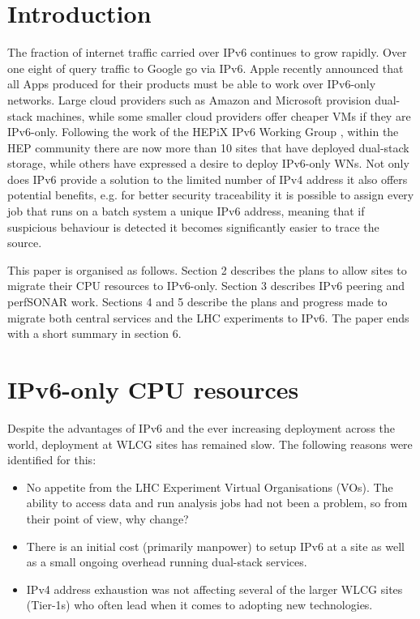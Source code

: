 \documentclass[a4paper]{jpconf}
\begin{document}
\section{Introduction}
The fraction of internet traffic carried over IPv6 continues to grow
rapidly. Over one eight of query traffic to Google go via
IPv6. Apple recently announced that
all Apps produced for their products must be able to work over
IPv6-only networks. Large cloud providers such as
Amazon and Microsoft provision
dual-stack machines, while some smaller cloud
providers offer cheaper VMs if they are
IPv6-only. 
Following the work of the HEPiX IPv6 Working Group \cite{ipv6wg}, 
within the HEP community there are now
more than 10 sites that have
deployed dual-stack storage, while others have expressed a desire to
deploy IPv6-only WNs. Not only does IPv6 provide a solution to the
limited number of IPv4 address it also offers potential benefits,
e.g. for better security traceability
 it is possible to assign every job
that runs on a batch system a unique IPv6 address,  meaning that
if suspicious behaviour is detected it becomes significantly easier to
trace the source.

This paper is organised as follows.  Section 2 describes the plans to allow sites to migrate their CPU resources to IPv6-only.  Section 3 describes IPv6 peering and perfSONAR work.  Sections 4 and 5 describe the plans and progress made to migrate both central services and the LHC experiments to IPv6.  The paper ends with a short summary in section 6.

\section{IPv6-only CPU resources}
Despite the advantages of IPv6 and the ever increasing deployment
across the world, deployment at WLCG sites has remained slow.  The
following reasons were identified for this:
\begin{itemize}
\item No appetite from the LHC Experiment Virtual Organisations (VOs).  The ability to access data and
  run analysis jobs had not been a problem, so from their point of
  view, why change?
\item There is an initial cost (primarily manpower) to setup IPv6 at a
  site as well as a small ongoing overhead running dual-stack
  services.
\item IPv4 address exhaustion was not affecting several of the larger
  WLCG sites (Tier-1s) who often lead when it comes to adopting new
  technologies.
\end{itemize}
\end{document}
